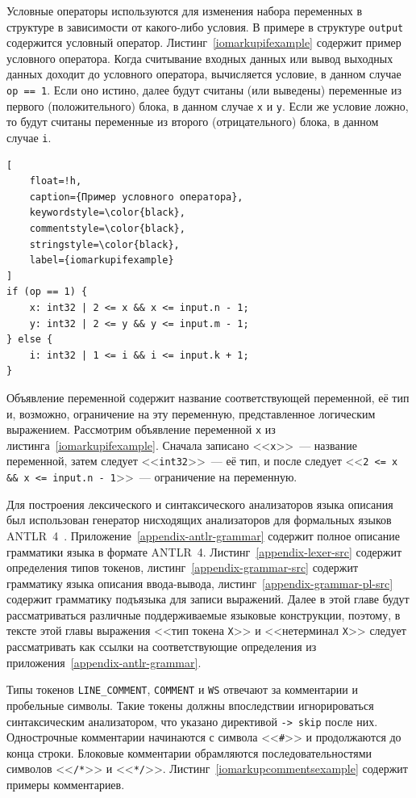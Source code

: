 \documentclass[times,specification,annotation]{style/itmo-student-thesis/itmo-student-thesis}
\begin{document}
Условные операторы используются для изменения набора переменных в структуре в зависимости от какого-либо условия. В примере в структуре \texttt{output} содержится условный оператор. Листинг~\ref{iomarkupifexample} содержит пример условного оператора. Когда считывание входных данных или вывод выходных данных доходит до условного оператора, вычисляется условие, в данном случае \texttt{op == 1}. Если оно истино, далее будут считаны (или выведены) переменные из первого (положительного) блока, в данном случае \texttt{x} и \texttt{y}. Если же условие ложно, то будут считаны переменные из второго (отрицательного) блока, в данном случае \texttt{i}.

\begin{lstlisting}[
    float=!h,
    caption={Пример условного оператора},
    keywordstyle=\color{black},
    commentstyle=\color{black},
    stringstyle=\color{black},
    label={iomarkupifexample}
]
if (op == 1) {
    x: int32 | 2 <= x && x <= input.n - 1;
    y: int32 | 2 <= y && y <= input.m - 1;
} else {
    i: int32 | 1 <= i && i <= input.k + 1;
}
\end{lstlisting}

Объявление переменной содержит название соответствующей переменной, её тип и, возможно, ограничение на эту переменную, представленное логическим выражением. Рассмотрим объявление переменной \texttt{x} из листинга~\ref{iomarkupifexample}. Сначала записано <<\texttt{x}>>~--- название переменной, затем следует <<\texttt{int32}>>~--- её тип, и после следует <<\texttt{2 <= x \&\& x <= input.n - 1}>>~--- ограничение на переменную.

Для построения лексического и синтаксического анализаторов языка описания был использован генератор нисходящих анализаторов для формальных языков ANTLR~4~\cite{parr2013definitive}. Приложение~\ref{appendix-antlr-grammar} содержит полное описание грамматики языка в формате ANTLR~4. Листинг~\ref{appendix-lexer-src} содержит определения типов токенов, листинг~\ref{appendix-grammar-src} содержит грамматику языка описания ввода-вывода, листинг~\ref{appendix-grammar-pl-src} содержит грамматику подъязыка для записи выражений. Далее в этой главе будут рассматриваться различные поддерживаемые языковые конструкции, поэтому, в тексте этой главы выражения <<тип токена \texttt{X}>> и <<нетерминал \texttt{X}>> следует рассматривать как ссылки на соответствующие определения из приложения~\ref{appendix-antlr-grammar}.

Типы токенов \texttt{LINE\_COMMENT}, \texttt{COMMENT} и \texttt{WS} отвечают за комментарии и пробельные символы. Такие токены должны впоследствии игнорироваться синтаксическим анализатором, что указано директивой \texttt{-> skip} после них. Однострочные комментарии начинаются с символа <<\texttt{\#}>> и продолжаются до конца строки. Блоковые комментарии обрамляются последовательностями символов <<\texttt{/*}>> и <<\texttt{*/}>>. Листинг~\ref{iomarkupcommentsexample} содержит примеры комментариев.
\end{document}
